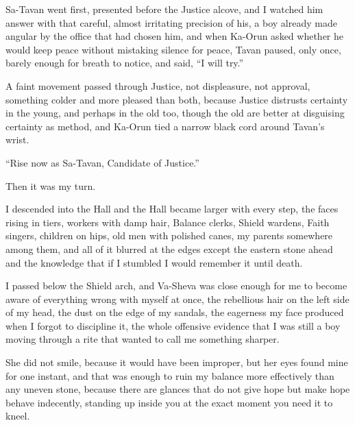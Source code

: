 Sa-Tavan went first, presented before the Justice alcove, and I watched him answer with that 
careful, almost irritating precision of his, a boy already made angular by the office that had 
chosen him, and when Ka-Orun asked whether he would keep peace without mistaking silence for peace, 
Tavan paused, only once, barely enough for breath to notice, and said, “I will try.”\par

A faint movement passed through Justice, not displeasure, not approval, something colder and more 
pleased than both, because Justice distrusts certainty in the young, and perhaps in the old too, 
though the old are better at disguising certainty as method, and Ka-Orun tied a narrow black cord 
around Tavan’s wrist.\par

“Rise now as Sa-Tavan, Candidate of Justice.”\par


Then it was my turn.\par

I descended into the Hall and the Hall became larger with every step, the faces rising in tiers, 
workers with damp hair, Balance clerks, Shield wardens, Faith singers, children on hips, old men 
with polished canes, my parents somewhere among them, and all of it blurred at the edges except 
the eastern stone ahead and the knowledge that if I stumbled I would remember it until death.\par

I passed below the Shield arch, and Va-Sheva was close enough for me to become aware of everything 
wrong with myself at once, the rebellious hair on the left side of my head, the dust on the edge 
of my sandals, the eagerness my face produced when I forgot to discipline it, the whole offensive 
evidence that I was still a boy moving through a rite that wanted to call me something sharper.\par

She did not smile, because it would have been improper, but her eyes found mine for one instant, 
and that was enough to ruin my balance more effectively than any uneven stone, because there are 
glances that do not give hope but make hope behave indecently, standing up inside you at the 
exact moment you need it to kneel.\par

